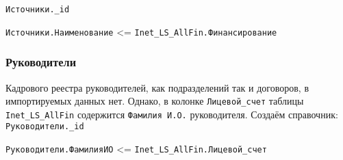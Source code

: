 \documentclass[12pt,a4paper]{scrartcl}
\begin{document}
\texttt{Источники.\_id}

\texttt{Источники.Наименование} <= \texttt{Inet\_LS\_AllFin.Финансирование}


\subsubsection*{Руководители}

Кадрового реестра руководителей, как подразделений так и договоров, в импортируемых данных нет.  Однако, в колонке \texttt{Лицевой\_счет} таблицы \texttt{Inet\_LS\_AllFin} содержится \texttt{Фамилия И.О.} руководителя. Создаём справочник:\\

\texttt{Руководители.\_id}

\texttt{Руководители.ФамилияИО} <= \texttt{Inet\_LS\_AllFin.Лицевой\_счет}
\end{document}
